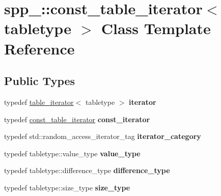 \hypertarget{classspp___1_1const__table__iterator}{}\section{spp\+\_\+\+:\+:const\+\_\+table\+\_\+iterator$<$ tabletype $>$ Class Template Reference}
\label{classspp___1_1const__table__iterator}
\subsection*{Public Types}
\begin{DoxyCompactItemize}
\item 
typedef \hyperlink{classspp___1_1table__iterator}{table\+\_\+iterator}$<$ tabletype $>$ {\bfseries iterator}\hypertarget{classspp___1_1const__table__iterator_a4514bfeacf8200a838605bfddd261446}{}\label{classspp___1_1const__table__iterator_a4514bfeacf8200a838605bfddd261446}

\item 
typedef \hyperlink{classspp___1_1const__table__iterator}{const\+\_\+table\+\_\+iterator} {\bfseries const\+\_\+iterator}\hypertarget{classspp___1_1const__table__iterator_aa6640ca470728913e7f8fbe596f0b02d}{}\label{classspp___1_1const__table__iterator_aa6640ca470728913e7f8fbe596f0b02d}

\item 
typedef std\+::random\+\_\+access\+\_\+iterator\+\_\+tag {\bfseries iterator\+\_\+category}\hypertarget{classspp___1_1const__table__iterator_a01f444e6c90478b68bf246503e8497ae}{}\label{classspp___1_1const__table__iterator_a01f444e6c90478b68bf246503e8497ae}

\item 
typedef tabletype\+::value\+\_\+type {\bfseries value\+\_\+type}\hypertarget{classspp___1_1const__table__iterator_ac3aa53e51714e8c71b94358cf5c8031a}{}\label{classspp___1_1const__table__iterator_ac3aa53e51714e8c71b94358cf5c8031a}

\item 
typedef tabletype\+::difference\+\_\+type {\bfseries difference\+\_\+type}\hypertarget{classspp___1_1const__table__iterator_a927cbdb7abfcaa02c6ed8a912cf18402}{}\label{classspp___1_1const__table__iterator_a927cbdb7abfcaa02c6ed8a912cf18402}

\item 
typedef tabletype\+::size\+\_\+type {\bfseries size\+\_\+type}\hypertarget{classspp___1_1const__table__iterator_ac519988320ec84456b26852564278eea}{}\label{classspp___1_1const__table__iterator_ac519988320ec84456b26852564278eea}


\end{DoxyCompactItemize}

